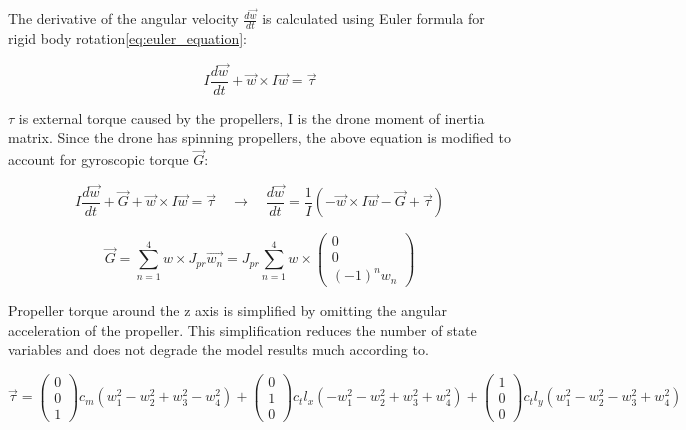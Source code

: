 The derivative of the angular velocity $\frac{d\vec{w}}{dt}$ is calculated using Euler formula for rigid body rotation\ref{eq:euler_equation}:

\begin{equation}
\label{eq:euler_equation}
    I \frac{d\vec{w}}{dt} + \vec{w} \times I\vec{w} = \vec{\tau}
\end{equation}

$\tau$ is external torque caused by the propellers, I is the drone moment of inertia matrix. Since the drone has spinning propellers, the above equation is modified to account for gyroscopic torque $\vec{G}$:

\begin{equation}
\label{eq:euler_equation_modified}
    I \frac{d\vec{w}}{dt} + \vec{G} + \vec{w} \times I\vec{w} = \vec{\tau}
    \quad \rightarrow \quad 
    \frac{d\vec{w}}{dt} = \frac{1}{I} \left( -\vec{w} \times I\vec{w} - \vec{G} + \vec{\tau} \right)
\end{equation}



\begin{equation}
\label{Gyroscopic_propeller}
    \vec{G} = \sum_{n=1}^{4} w \times J_{pr} \vec{w_n} = 
    J_{pr} \sum_{n=1}^{4} w \times  
    \begin{pmatrix}
     0 \\
     0 \\
     (-1)^{n} w_n
    \end{pmatrix}
\end{equation}



Propeller torque around the z axis is simplified by omitting the angular acceleration of the propeller. This simplification reduces the number of state variables and does not degrade the model results much according to\cite{simple_control_paper}. 

\begin{equation}
\label{propeller_torques}
    \vec{\tau} = 
    \begin{pmatrix}
     0 \\
     0 \\
     1 
     \end{pmatrix}
     c_m \left( w_1^2 - w_2^2 + w_3^2 - w_4^2 \right) +
     \begin{pmatrix}
     0 \\
     1 \\
     0 
     \end{pmatrix}
     c_t l_x \left( -w_1^2 - w_2^2 + w_3^2 + w_4^2 \right) + 
     \begin{pmatrix}
     1 \\
     0 \\
     0 
     \end{pmatrix}
     c_t l_y \left( w_1^2 - w_2^2 - w_3^2 + w_4^2 \right)
\end{equation}

